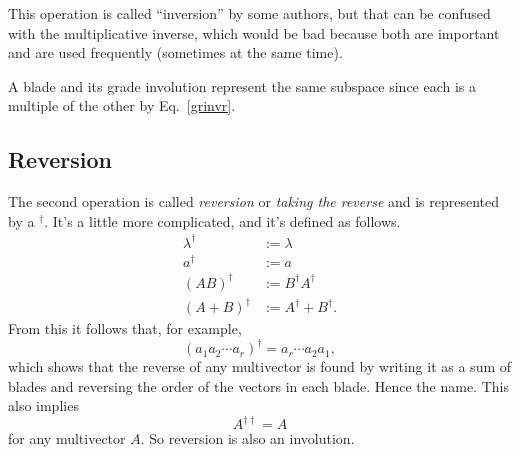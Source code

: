\documentclass{utarticle}
\newcommand{\rev}[1]{\ensuremath{#1^\dagger}}
\newcommand{\doublerev}[1]{\ensuremath{#1^{\dagger\dagger}}}
\begin{document}
This operation is called ``inversion'' by some authors, but that can be confused 
with the multiplicative inverse, which would be bad because both are important and
are used frequently (sometimes at the same time).

A blade and its grade involution represent the same subspace since 
each is a multiple of the other by Eq.~\eqref{grinvr}.

\subsection{Reversion}
\label{reverse}

The second operation is called \emph{reversion} or \emph{taking the
reverse} and is represented by a \rev{}. It's a little more complicated,
and it's defined as follows.
\begin{align}
\rev{\lambda} & := \lambda \nonumber \\
\rev{a} & := a \nonumber \\
\rev{(AB)} & := \rev{B} \rev{A} \nonumber \\
\rev{(A + B)} & := \rev{A} + \rev{B}.
\label{revrules} 
\end{align}
From this it follows that, for example, 
\begin{equation}
\rev{(a_1 a_2 \dotsb a_r)} = a_r \dotsb a_2 a_1,
\end{equation}
which shows that the reverse of any multivector is found by writing it
as a sum of blades and reversing the order of the vectors in each
blade.  Hence the name.  This also implies
\begin{equation} \doublerev{A} = A \end{equation} 
for any multivector $A$.  So reversion is also an involution.
\end{document}
